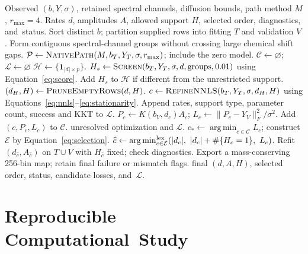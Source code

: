 \documentclass[mathematics,article,accept,moreauthors]{Definitions/mdpi}
\newcommand{\one}{\mathbf{1}}
\newcommand{\argmin}{\operatorname*{arg\,min}}
\begin{document}
\begin{algorithm}[H]
\caption{Automatic spectral-support selection for RAI-S and~DOME-S.}\label{alg:support}
\begin{algorithmic}[1]
\Require Observed $(b,Y,\sigma)$, retained spectral channels, diffusion bounds, path method $M$, $r_{\max}=4$.
\Ensure Rates $d$, amplitudes $A$, allowed support $H$, selected order, diagnostics, and~status.
\State Sort distinct $b$; partition supplied rows into fitting $T$ and validation $V$.
\State Form contiguous spectral-channel groups without crossing large chemical shift gaps.
\State $\mathcal P\gets\Call{NativePath}{M,b_T,Y_T,\sigma,r_{\max}}$; include the zero model.
\State $\mathcal C\gets\varnothing$; $\mathcal L\gets\varnothing$ 
  \State $\mathcal H\gets\{\one_{|d|\times p}\}$.
    \State $H_s\gets\Call{Screen}{b_T,Y_T,\sigma,d,\text{groups},0.01}$ using Equation~\eqref{eq:score}.
    \State Add $H_s$ to $\mathcal H$ if different from the unrestricted support.
  \EndIf
    \State $ (d_H,H)\gets\Call{PruneEmptyRows}{d,H}$.
    \State $c\gets\Call{RefineNNLS}{b_T,Y_T,\sigma,d_H,H}$ using Equations~\eqref{eq:nnls}--\eqref{eq:stationarity}.
    \State Append rates, support type, parameter count, success and KKT to $\mathcal L$.
      \State $P_c\gets K(b_V,d_c)A_c$; $L_c\gets\|P_c-Y_V\|_F^2/\sigma^2$.
      \State Add $(c,P_c,L_c)$ to $\mathcal C$.
    \EndIf
  \EndFor
\EndFor
{}
  \State \Return unresolved optimization and $\mathcal L$.
\EndIf
\State $c_*\gets\argmin_{c\in\mathcal C}L_c$; construct $\mathcal E$ by Equation~\eqref{eq:selection}.
\State $\widehat c\gets\argmin_{c\in\mathcal E}^{\rm lex}(|d_c|,\ |d_c|+\#\{H_c=1\},\ L_c)$.
\State Refit $(d_{\widehat c},A_{\widehat c})$ on $T\cup V$ with $H_{\widehat c}$ fixed; check diagnostics.
\State Export a mass-conserving 256-bin map; retain final failure or mismatch flags.
\State \Return final $(d,A,H)$, selected order, status, candidate losses, and~$\mathcal L$.
\end{algorithmic}
\end{algorithm}



%

\section{Reproducible Computational~Study}\label{sec:experiments}
\end{document}
